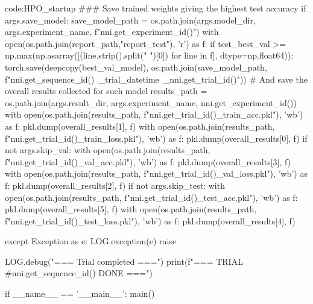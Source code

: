\begin{mycodebox}{code:HPO_startup}
        ### Save trained weights giving the highest test accuracy
        if args.save_model:
            save_model_path = os.path.join(args.model_dir,
                args.experiment_name,
                f"{nni.get_experiment_id()}")
            with open(os.path.join(report_path,"report_test"), 'r') as f:
                if test_best_val >= np.max(np.asarray([(line.strip().split(" ")[0]) for line in f], dtype=np.float64)):
                    torch.save(deepcopy(best_val_model),
                        os.path.join(save_model_path,
                            f"{nni.get_sequence_id()}\
                            _{trial_datetime}\
                            _{nni.get_trial_id()}"))
                    # And save the overall results collected for such model
                    results_path = os.path.join(args.result_dir,
                        args.experiment_name,
                        nni.get_experiment_id())
                    with open(os.path.join(results_path,
                        f"{nni.get_trial_id()}_train_acc.pkl"),
                        'wb') as f:
                        pkl.dump(overall_results[1], f)
                    with open(os.path.join(results_path,
                        f"{nni.get_trial_id()}_train_loss.pkl"),
                        'wb') as f:
                        pkl.dump(overall_results[0], f)
                    if not args.skip_val:
                        with open(os.path.join(results_path,
                            f"{nni.get_trial_id()}_val_acc.pkl"),
                            'wb') as f:
                            pkl.dump(overall_results[3], f)
                        with open(os.path.join(results_path,
                            f"{nni.get_trial_id()}_val_loss.pkl"),
                            'wb') as f:
                            pkl.dump(overall_results[2], f)
                    if not args.skip_test:
                        with open(os.path.join(results_path,
                            f"{nni.get_trial_id()}_test_acc.pkl"),
                            'wb') as f:
                            pkl.dump(overall_results[5], f)
                        with open(os.path.join(results_path,
                            f"{nni.get_trial_id()}_test_loss.pkl"),
                            'wb') as f:
                            pkl.dump(overall_results[4], f)
    
    except Exception as e:
        LOG.exception(e)
        raise

    LOG.debug("=== Trial completed ===")
    print(f"=== TRIAL #{nni.get_sequence_id()} DONE ===")

if __name__ == '__main__':
    main()
\end{mycodebox}


